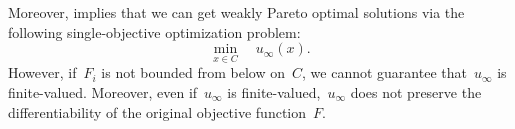 \documentclass[../../main]{subfiles}
\begin{document}
Moreover,  implies that we can get weakly Pareto optimal solutions via the following single-objective optimization problem:
\begin{equation}
    \min_{x \in C} \quad u_\infty(x)
.\end{equation} 
However, if~$F_i$ is not bounded from below on~$C$, we cannot guarantee that~$u_\infty$ is finite-valued.
Moreover, even if~$u_\infty$ is finite-valued,~$u_\infty$ does not preserve the differentiability of the original objective function~$F$.
\end{document}
